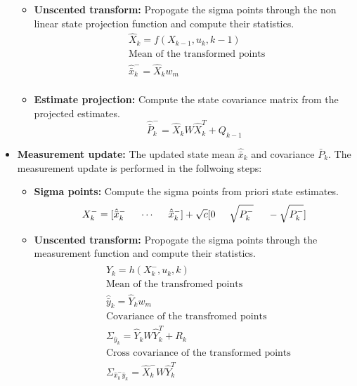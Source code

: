 \begin{itemize}
\begin{itemize}
        \item \textbf{Unscented transform:} Propogate the sigma points through the non linear state projection function and compute their statistics.
        \begin{equation}
        \begin{split}
            &\hat X_k = f(X_{k-1},u_k,k-1) \\
            &\text{Mean of the transformed points }\\
            &\hat{\bar x}^-_k = \hat X_k w_m \\
        \end{split}
        \end{equation}

        \item \textbf{Estimate projection:} Compute the state covariance matrix from the projected estimates.
        \begin{equation}
            \hat{\bar P}^-_k = \hat X_k W \hat X_k^T + Q_{k-1}
        \end{equation}

    \end{itemize}
        
    \item \textbf{Measurement update:} The updated state mean $\hat{\bar x}_k$ and covariance ${\bar P}_k$. The measurement update is performed in the follwoing steps:
    \begin{itemize}
        \item \textbf{Sigma points:} Compute the sigma points from priori state estimates.
        \begin{equation}
        X_k^- = [ \hat{\bar{x}}_k^- \hspace{5mm} \cdots \hspace{5mm} \hat{\bar{x}}_k^-]+ \sqrt c [ 0 \hspace{5mm} \sqrt{P_k^-} \hspace{5mm} - \sqrt{P_k^-} ]
        \end{equation}

        \item \textbf{Unscented transform:} Propogate the sigma points through the measurement function and compute their statistics.
        \begin{equation}
        \begin{split}
        &\hat Y_k = h(X_{k}^-,u_k,k) \\
        &\text{Mean of the transfromed points}\\
        &\hat{\bar y}_k = \hat Y_k w_m \\
        &\text{Covariance of the transfromed points}\\
        &\Sigma_{\hat y_k} = \hat Y_k W \hat Y_k^T + R_k \\
        &\text{Cross covariance of the transformed points}\\
        &\Sigma_{\hat x_k^- \hat y_k} = \hat X_k^- W \hat Y_k^T \\
        \end{split}
        \end{equation}


\end{itemize}
\end{itemize}
